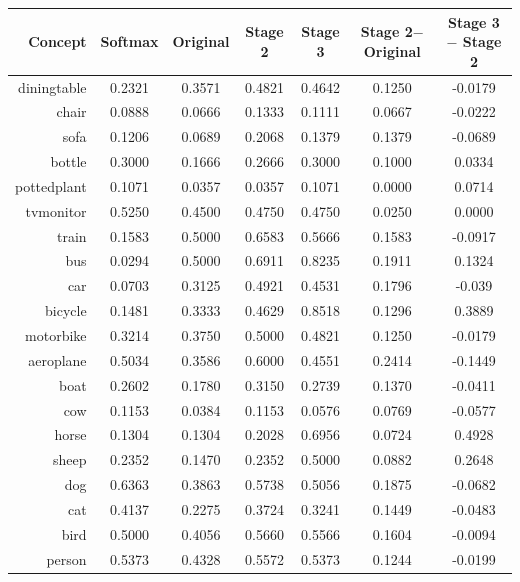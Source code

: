 \documentclass[11pt,a4paper]{book}
\begin{document}
\begin{table}[htbp]
\centering
\begin{tabular}{r|c|c|c|c|c|c}
Concept & Softmax & Original & Stage 2 & Stage 3 & \makecell{Stage 2$-$\\Original} & \makecell{Stage 3$-$\\Stage 2}\\\hline
diningtable   & 0.2321 & 0.3571 & 0.4821 & 0.4642 & 0.1250 & -0.0179\\
chair         & 0.0888 & 0.0666 & 0.1333 & 0.1111 & 0.0667 & -0.0222\\
sofa          & 0.1206 & 0.0689 & 0.2068 & 0.1379 & 0.1379 & -0.0689\\
bottle        & 0.3000 & 0.1666 & 0.2666 & 0.3000 & 0.1000 & 0.0334\\
pottedplant   & 0.1071 & 0.0357 & 0.0357 & 0.1071 & 0.0000 & 0.0714\\
tvmonitor     & 0.5250 & 0.4500 & 0.4750 & 0.4750 & 0.0250 & 0.0000\\
train         & 0.1583 & 0.5000 & 0.6583 & 0.5666 & 0.1583 & -0.0917\\
bus           & 0.0294 & 0.5000 & 0.6911 & 0.8235 & 0.1911 & 0.1324\\
car           & 0.0703 & 0.3125 & 0.4921 & 0.4531 & 0.1796 & -0.039\\
bicycle       & 0.1481 & 0.3333 & 0.4629 & 0.8518 & 0.1296 & 0.3889\\
motorbike     & 0.3214 & 0.3750 & 0.5000 & 0.4821 & 0.1250 & -0.0179\\
aeroplane     & 0.5034 & 0.3586 & 0.6000 & 0.4551 & 0.2414 & -0.1449\\
boat          & 0.2602 & 0.1780 & 0.3150 & 0.2739 & 0.1370 & -0.0411\\
cow           & 0.1153 & 0.0384 & 0.1153 & 0.0576 & 0.0769 & -0.0577\\
horse         & 0.1304 & 0.1304 & 0.2028 & 0.6956 & 0.0724 & 0.4928\\
sheep         & 0.2352 & 0.1470 & 0.2352 & 0.5000 & 0.0882 & 0.2648\\
dog           & 0.6363 & 0.3863 & 0.5738 & 0.5056 & 0.1875 & -0.0682\\
cat           & 0.4137 & 0.2275 & 0.3724 & 0.3241 & 0.1449 & -0.0483\\
bird          & 0.5000 & 0.4056 & 0.5660 & 0.5566 & 0.1604 & -0.0094\\
person        & 0.5373 & 0.4328 & 0.5572 & 0.5373 & 0.1244 & -0.0199\\\hline

\end{tabular}
\end{table}
\end{document}
